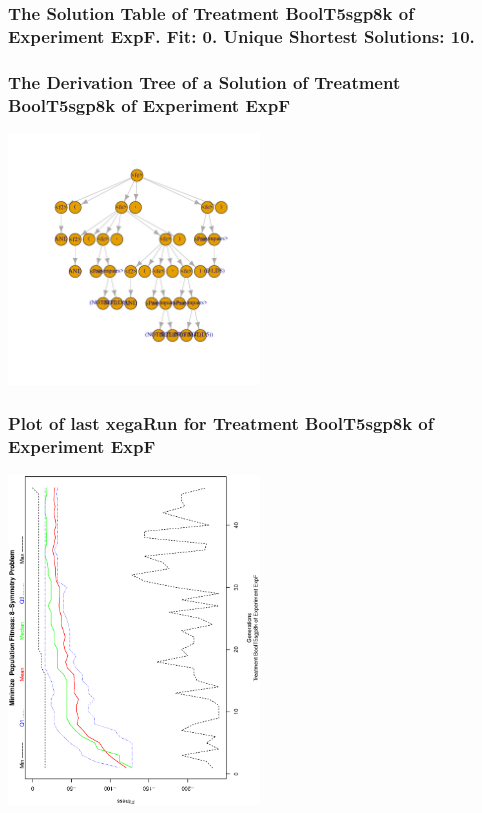 \documentclass[18pt,c]{beamer}
\begin{document}
 \begin{frame}
 \fontsize{8pt}{9pt}\selectfont
 \frametitle{ The Solution Table of Treatment BoolT5sgp8k of Experiment ExpF. Fit: 0. Unique Shortest Solutions: 10. }

 \label{ExpFSolutionTable009.tex}  
 \end{frame}

 \begin{frame}
 \frametitle{ The Derivation Tree of a Solution of Treatment BoolT5sgp8k of Experiment ExpF }
 \begin{center}
\includegraphics[width=0.5\textwidth, angle=0]
{ExpFDerivationTreeFigure009.pdf}
 \end{center}
 \label{report/ExpFDerivationTreeFigure009.pdf}  
 \end{frame}

 \begin{frame}
 \frametitle{ Plot of last xegaRun for Treatment BoolT5sgp8k of Experiment ExpF }
 \begin{center}
\includegraphics[width=0.5\textwidth, angle=-90]
{ExpFPlotPopStatsFigure009.eps}
 \end{center}
 \label{report/ExpFPlotPopStatsFigure009.eps}  
 \end{frame}
\end{document}
